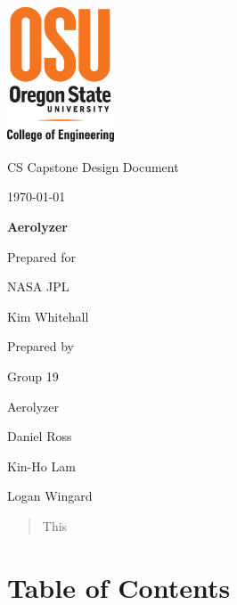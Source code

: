 \documentclass[onecolumn, draftclsnofoot,10pt, compsoc]{IEEEtran}
\def \CapstoneTeamName{		Aerolyzer}
\def \CapstoneTeamNumber{		19}
\def \GroupMemberOne{			Daniel Ross}
\def \GroupMemberTwo{			Kin-Ho Lam}
\def \GroupMemberThree{			Logan Wingard}
\def \CapstoneProjectName{		Aerolyzer}
\def \CapstoneSponsorCompany{	NASA JPL}
\def \CapstoneSponsorPerson{		Kim Whitehall}
\def \DocType{		%
	Design Document
}
\newcommand{\NameSigPair}[1]{\par
	\makebox[2.75in][r]{#1} \hfil 	\makebox[3.25in]{\makebox[2.25in]{\hrulefill} \hfill		\makebox[.75in]{\hrulefill}}
	\par\vspace{-12pt} \textit{\tiny\noindent
		\makebox[2.75in]{} \hfil		\makebox[3.25in]{\makebox[2.25in][r]{Signature} \hfill	\makebox[.75in][r]{Date}}}}
\renewcommand{\NameSigPair}[1]{#1}
\begin{document}
	\begin{titlepage}
		\begin{singlespace}
			\includegraphics[height=4cm]{coe_v_spot1}
			\hfill 
			\par\vspace{.2in}
			\centering
			\scshape{
				\huge CS Capstone \DocType \par
				{\large\today}\par
				\vspace{.5in}
				\textbf{\Huge\CapstoneProjectName}\par
				\vfill
				{\large Prepared for}\par
				\Huge \CapstoneSponsorCompany\par
				\vspace{5pt}
				{\Large\NameSigPair{\CapstoneSponsorPerson}\par}
				{\large Prepared by }\par
				Group\CapstoneTeamNumber\par
				\CapstoneTeamName\par 
				\vspace{5pt}
				{\large
					\NameSigPair{\GroupMemberOne}\par
					\NameSigPair{\GroupMemberTwo}\par
					\NameSigPair{\GroupMemberThree}\par
				}
				\vspace{20pt}
			}
			\begin{abstract}
				This 
			\end{abstract}     
		\end{singlespace}
	\end{titlepage}

\section{Table of Contents}
\tableofcontents
\clearpage
\end{document}
